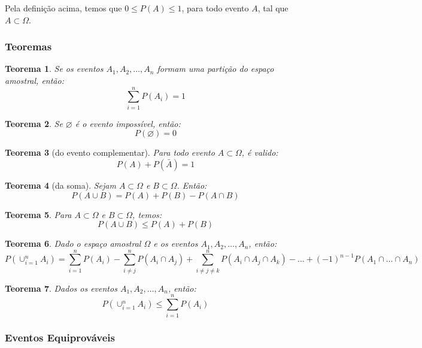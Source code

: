 \documentclass[oneside,a4paper,12pt]{article}
\newtheorem{theorem}{Teorema}[section]
\begin{document}
Pela definição acima, temos que $0\leq P(A) \leq 1$, para todo evento $A$, tal que $A \subset \Omega$.

\subsubsection{Teoremas}

\begin{theorem}
	Se os eventos $A_1,A_2,\dots,A_n$ formam uma partição do espaço amostral, então:
	$$\displaystyle \sum_{i = 1}^{n}P(A_i) = 1$$
\end{theorem}

\begin{theorem}
	Se $\varnothing$ é o evento impossível, então:
	$$P(\varnothing) = 0$$
\end{theorem}

\begin{theorem}[do evento complementar]
	Para todo evento $A \subset \Omega$, é valido:
	$$P(A) + P(\bar{A}) = 1$$
\end{theorem}

\begin{theorem}[da soma]
	Sejam $A \subset \Omega$ e $B \subset \Omega$. Então:
	$$P(A \cup B) = P(A) + P(B) - P(A \cap B)$$
\end{theorem}

\begin{theorem}
	Para $A \subset \Omega$ e $B \subset \Omega$, temos:
	$$P(A \cup B) \leq P(A) + P(B)$$
\end{theorem}

\begin{theorem}
	Dado o espaço amostral $\Omega$ e os eventos $A_1, A_2, \dots, A_n$, então:
	$$P\left( \displaystyle \cup_{i=1}^{n} A_i \right) = \displaystyle \sum_{i = 1}^{n}P(A_i) - \displaystyle \sum_{i \neq j}^{n}P(A_i \cap A_j) + \displaystyle \sum_{i \neq j \neq k}^{n}P(A_i \cap A_j \cap A_k) - \dots + (-1)^{n-1}P(A_1\cap\dots\cap A_n)$$
\end{theorem}

\begin{theorem}
	Dados os eventos $A_1,A_2,\dots,A_n$, então:
	$$P\left( \displaystyle \cup_{i=1}^{n} A_i \right) \leq \displaystyle \sum_{i = 1}^{n}P(A_i)$$
\end{theorem}

\subsubsection{Eventos Equiprováveis}
\end{document}
